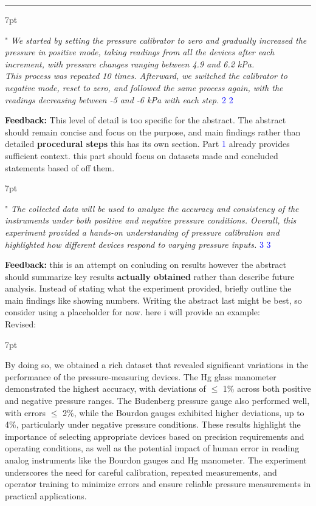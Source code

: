 \documentclass{article}
\newcommand{\formalsource}{} %
\newenvironment{formal}[3][]{%
	\renewcommand{\formalsource}{#1}%
	\def\FrameCommand{%
		\hspace{1pt}%
		{\color{#2}\vrule width 2pt}%
		{\color{#3}\vrule width 4pt}%
		\colorbox{#3}%
	}%
	\MakeFramed{\advance\hsize-\width\FrameRestore}%
	\noindent\hspace{-4.55pt}%
	\begin{adjustwidth}{}{7pt}%
		\vspace{2pt}%
	}%
	{%
		\vspace{4pt}%
		\ifx\formalsource\empty %
		\else
		\hfill{\footnotesize{\formalsource}}%
		\fi
	\end{adjustwidth}\endMakeFramed%
}
\begin{document}
\hrule
\begin{formal}[\textcolor{blue}{2}]{blue!40!black}{blue!10!white}
	\Large" \large \textit{We started by setting the pressure calibrator to zero and gradually increased the pressure in positive mode, taking readings from all the devices after each increment, with pressure changes ranging between 4.9 and 6.2 kPa.\\[1em]
	This process was repeated 10 times. Afterward, we switched the calibrator to negative mode, reset to zero, and followed the same process again, with the readings decreasing between -5 and -6 kPa with each step.}
\end{formal}
\noindent\textbf{Feedback:} This level of detail is too specific for the abstract. The abstract should remain concise and focus on the purpose, and main findings rather than detailed \textbf{procedural steps} this has its own section. Part \textcolor{blue}{1} already provides sufficient context. this part should focus on datasets made and concluded statements based of off them.
\begin{formal}[\textcolor{blue}{3}]{blue!40!black}{blue!10!white}
	\Large" \large \textit{The collected data will be used to analyze the accuracy and consistency of the instruments under both positive and negative pressure conditions. Overall, this experiment provided a hands-on understanding of pressure calibration and highlighted how different devices respond to varying pressure inputs.} 
\end{formal}
\noindent\textbf{Feedback:} this is an attempt on conluding on results however the abstract should summarize key results \textbf{actually obtained} rather than describe future analysis. Instead of stating what the experiment provided, briefly outline the main findings like showing numbers. Writing the abstract last might be best, so consider using a placeholder for now. here i will provide an example:\\[1em]
Revised:
\begin{formal}{green!40!black}{green!10!white}
By doing so, we obtained a rich dataset that revealed significant variations in the performance of the pressure-measuring devices. The Hg glass manometer demonstrated the highest accuracy, with deviations of $\leq$ 1\% across both positive and negative pressure ranges. The Budenberg pressure gauge also performed well, with errors $\leq$ 2\%, while the Bourdon gauges exhibited higher deviations, up to 4\%, particularly under negative pressure conditions.  These results highlight the importance of selecting appropriate devices based on precision requirements and operating conditions, as well as the potential impact of human error in reading analog instruments like the Bourdon gauges and Hg manometer. The experiment underscores the need for careful calibration, repeated measurements, and operator training to minimize errors and ensure reliable pressure measurements in practical applications.
\end{formal}
\end{document}
